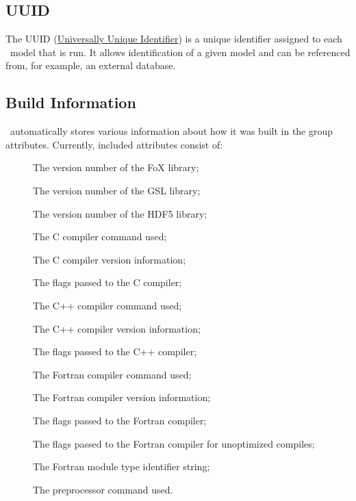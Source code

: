 \subsection{UUID}\label{sec:UUID}

The UUID (\href{https://secure.wikimedia.org/wikipedia/en/wiki/Universally_unique_identifier}{Universally Unique Identifier}) is a unique identifier assigned to each \glc\ model that is run. It allows identification of a given model and can be referenced from, for example, an external database.

\subsection{Build Information}\label{sec:BuildInformation}

\glc\ automatically stores various information about how it was built in the  group attributes. Currently, included attributes consist of:
\begin{description}
\item[] The version number of the FoX library;
\item[] The version number of the GSL library;
\item[] The version number of the HDF5 library;
\item[] The C compiler command used;
\item[] The C compiler version information;
\item[] The flags passed to the C compiler;
\item[] The C++ compiler command used;
\item[] The C++ compiler version information;
\item[] The flags passed to the C++ compiler;
\item[] The Fortran compiler command used;
\item[] The Fortran compiler version information;
\item[] The flags passed to the Fortran compiler;
\item[] The flags passed to the Fortran compiler for unoptimized compiles;
\item[] The Fortran module type identifier string;
\item[] The preprocessor command used.
\end{description}

